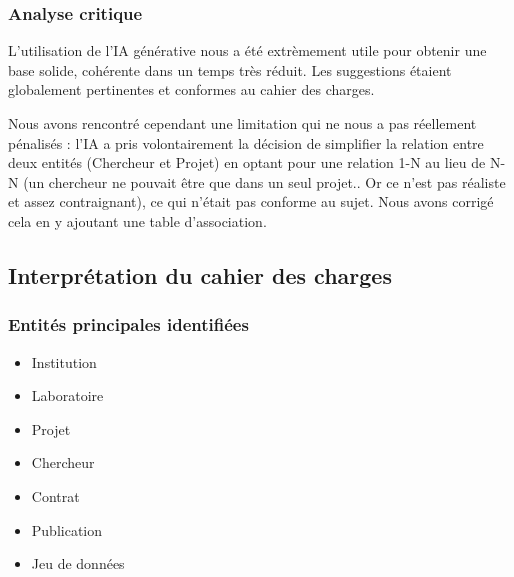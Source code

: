 \documentclass[12pt,a4paper]{article}
\begin{document}
\subsubsection{Analyse critique}
L'utilisation de l'IA générative nous a été extrèmement utile pour obtenir une base solide, cohérente dans un temps très réduit. Les suggestions étaient globalement pertinentes et conformes au cahier des charges.

Nous avons rencontré cependant une limitation qui ne nous a pas réellement pénalisés : l'IA a pris volontairement la décision de simplifier la relation entre deux entités (Chercheur et Projet) en optant pour une relation 1-N au lieu de N-N (un chercheur ne pouvait être que dans un seul projet.. Or ce n'est pas réaliste et assez contraignant), ce qui n'était pas conforme au sujet. Nous avons corrigé cela en y ajoutant une table d'association.

\subsection{Interprétation du cahier des charges}

\subsubsection{Entités principales identifiées}
\begin{itemize}
    \item Institution
    \item Laboratoire
    \item Projet
    \item Chercheur
    \item Contrat
    \item Publication
    \item Jeu de données
\end{itemize}
\end{document}
